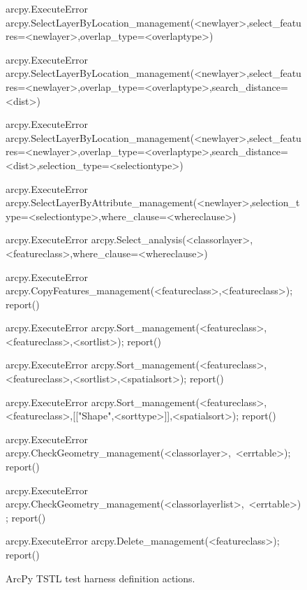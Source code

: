 \begin{figure}
{\begin{code}
{arcpy.ExecuteError} arcpy.SelectLayerByLocation\_management(<newlayer>,select\_features=<newlayer>,overlap\_type=<overlaptype>)

{arcpy.ExecuteError} arcpy.SelectLayerByLocation\_management(<newlayer>,select\_features=<newlayer>,overlap\_type=<overlaptype>,search\_distance=<dist>)

{arcpy.ExecuteError} arcpy.SelectLayerByLocation\_management(<newlayer>,select\_features=<newlayer>,overlap\_type=<overlaptype>,search\_distance=<dist>,selection\_type=<selectiontype>)

{arcpy.ExecuteError} arcpy.SelectLayerByAttribute\_management(<newlayer>,selection\_type=<selectiontype>,where\_clause=<whereclause>)

{arcpy.ExecuteError} arcpy.Select\_analysis(<classorlayer>,<featureclass>,where\_clause=<whereclause>)

{arcpy.ExecuteError} arcpy.CopyFeatures\_management(<featureclass>,<featureclass>); report()

{arcpy.ExecuteError} arcpy.Sort\_management(<featureclass>,<featureclass>,<sortlist>); report()

{arcpy.ExecuteError} arcpy.Sort\_management(<featureclass>,<featureclass>,<sortlist>,<spatialsort>); report()

{arcpy.ExecuteError} arcpy.Sort\_management(<featureclass>,<featureclass>,[["Shape",<sorttype>]],<spatialsort>); report()

{arcpy.ExecuteError} arcpy.CheckGeometry\_management(<classorlayer>,~<errtable>); report()

{arcpy.ExecuteError} arcpy.CheckGeometry\_management(<classorlayerlist>,~<errtable>); report()

{arcpy.ExecuteError} arcpy.Delete\_management(<featureclass>); report()
\end{code}
}
\caption{ArcPy TSTL test harness definition actions.}
\end{figure}
